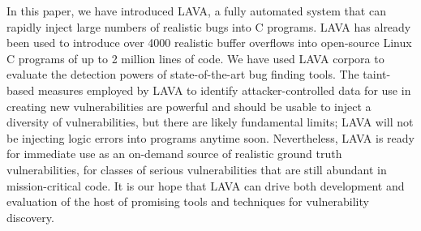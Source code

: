In this paper, we have introduced LAVA, a fully automated system that can rapidly inject large numbers of realistic bugs into C programs.
LAVA has already been used to introduce over 4000 realistic buffer overflows into open-source Linux C programs of up to 2 million lines of code.  
We have used LAVA corpora to evaluate the detection powers of state-of-the-art bug finding tools.
The taint-based measures employed by LAVA to identify attacker-controlled data for use in creating new vulnerabilities are powerful and should be usable to inject a diversity of vulnerabilities, but there are likely fundamental limits; LAVA will not be injecting logic errors into programs anytime soon.
Nevertheless, LAVA is ready for immediate use as an on-demand source of realistic ground truth vulnerabilities, for classes of serious vulnerabilities that are still abundant in mission-critical code.
It is our hope that LAVA can drive both development and evaluation of the host of promising tools and techniques for vulnerability discovery.


